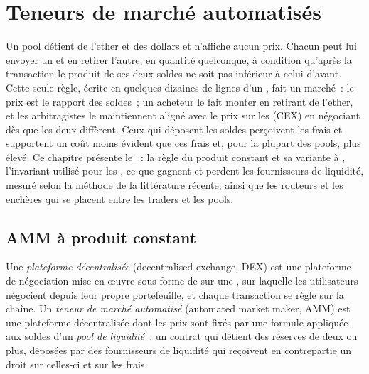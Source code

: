 \chapter{Teneurs de marché automatisés}\label{ch:m3:automated-market-makers}

Un pool détient de l'ether et des dollars et n'affiche aucun prix. Chacun peut lui envoyer un  et en retirer l'autre,
en quantité quelconque, à condition qu'après la transaction le produit de ses deux soldes ne soit pas inférieur à
celui d'avant. Cette seule règle, écrite en quelques dizaines de lignes d'un , fait un marché~: le prix est
le rapport des soldes~; un acheteur le fait monter en retirant de l'ether, et les arbitragistes le maintiennent aligné
avec le prix sur les  (CEX) en négociant dès que les deux diffèrent. Ceux qui déposent les
soldes perçoivent les frais et supportent un coût moins évident que ces frais et, pour la plupart des pools, plus élevé.
Ce chapitre présente le ~: la règle du produit constant et sa variante à ,
l'invariant utilisé pour les , ce que gagnent et perdent les fournisseurs de liquidité, mesuré
selon la méthode de la littérature récente, ainsi que les routeurs et les enchères qui se placent entre les traders et les pools.

\section{AMM à produit constant}

\begin{definition}\label{def:m3:automated-market-makers:amm}
Une \emph{plateforme décentralisée} (decentralised exchange, DEX) est une plateforme de négociation mise en œuvre
sous forme de  sur une , sur laquelle les utilisateurs négocient depuis leur propre portefeuille, et chaque transaction se règle sur la chaîne.
Un \emph{teneur de marché automatisé} (automated market maker, AMM) est une plateforme décentralisée dont les prix sont
fixés par une formule appliquée aux soldes d'un \emph{pool de liquidité}~: un contrat qui détient des
réserves de deux  ou plus, déposées par des fournisseurs de liquidité qui reçoivent en contrepartie un droit sur celles-ci et sur les frais.
\end{definition}

